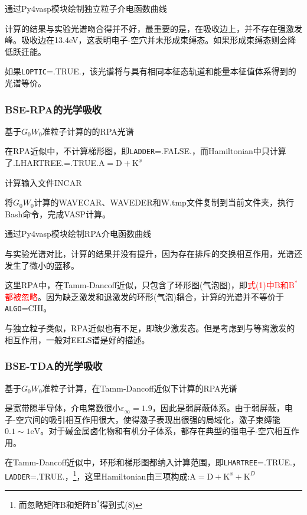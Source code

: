 通过\textrm{Py4vasp}模块绘制独立粒子介电函数曲线

计算的结果与实验光谱吻合得并不好，最重要的是，在吸收边上，并不存在强激发峰。吸收边在13.4\textrm{eV}，这表明电子-空穴并未形成束缚态。如果形成束缚态则会降低跃迁能。

如果\texttt{LOPTIC}=\textrm{.TRUE.}，该光谱将与具有相同本征态轨道和能量本征值体系得到的光谱等价。

\subsubsection{\rm{BSE-RPA}的光学吸收}
基于$G_0W_0$准粒子计算的的\textrm{RPA}光谱

在\textrm{RPA}近似中，不计算梯形图，即\texttt{LADDER}=\textrm{.FALSE.}，而\textrm{Hamiltonian}中只计算了\textrm{.LHARTREE.}=\textrm{.TRUE.}$\mathrm{A}=\mathrm{D}+\mathrm{K}^x$

计算输入文件\textrm{INCAR}

将$G_0W_0$计算的\textrm{WAVECAR}、\textrm{WAVEDER}和\textrm{W.tmp}文件复制到当前文件夹，执行\textrm{Bash}命令，完成\textrm{VASP}计算。

通过\textrm{Py4vasp}模块绘制\textrm{RPA}介电函数曲线

与实验光谱对比，计算的结果并没有提升，因为存在排斥的交换相互作用，光谱还发生了微小的蓝移。

这里\textrm{RPA}中，在\textrm{Tamm-Dancoff}近似，只包含了环形图(气泡图)，即\textcolor{red}{式(1)中$\mathrm{B}$和$\mathrm{B}^{\ast}$都被忽略}。因为缺乏激发和退激发的环形(气泡)耦合，计算的光谱并不等价于\texttt{ALGO}=\textrm{CHI}。

与独立粒子类似，\textrm{RPA}近似也有不足，即缺少激发态。但是考虑到与等离激发的相互作用，一般对\textrm{EELS}谱是好的描述。

\subsubsection{\rm{BSE-TDA}的光学吸收}
基于$G_0W_0$准粒子计算，在\textrm{Tamm-Dancoff}近似下计算的\textrm{RPA}光谱

是宽带隙半导体，介电常数很小$\varepsilon_{\infty}=1.9$，因此是弱屏蔽体系。由于弱屏蔽，电子-空穴间的吸引相互作用很大，使得激子表现出很强的局域化，激子束缚能$0.1\sim1\mathrm{eV}$。对于碱金属卤化物和有机分子体系，都存在典型的强电子-空穴相互作用。

在\textrm{Tamm-Dancoff}近似中，环形和梯形图都纳入计算范围，即\texttt{LHARTREE}=\textrm{.TRUE.}，\texttt{LADDER}=\textrm{.TRUE.}，\footnote{而忽略矩阵$\mathrm{B}$和矩阵$\mathrm{B}^{\ast}$得到式(8)}，这里\textrm{Hamiltonian}由三项构成:$\mathrm{A}=\mathrm{D}+\mathrm{K}^x+\mathrm{K}^D$

